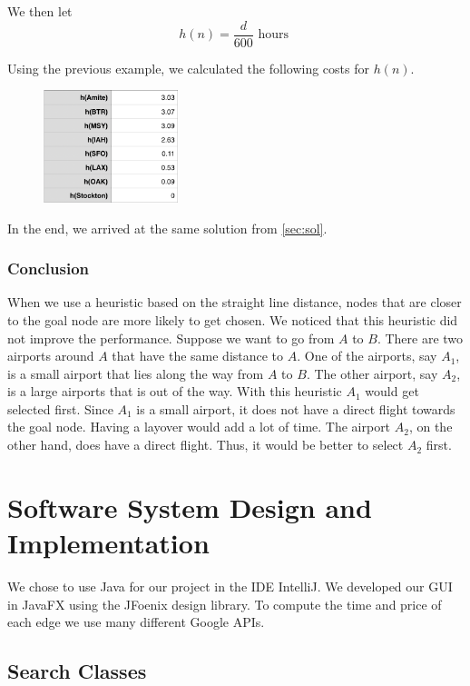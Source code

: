 \documentclass[11pt]{article}
\begin{document}
We then let
$$h(n) = \frac{d}{600} \text{ hours }$$

Using the previous example, we calculated the following costs for $h(n)$.

\begin{figure}[!ht]
  \centering
  \includegraphics[width=0.35\textwidth]{hn}
  \label{fig:time_lim}
\end{figure}

In the end, we arrived at the same solution from \ref{sec:sol}.

\subsubsection{Conclusion}

When we use a heuristic based on the straight line distance, nodes that are closer to the goal node are more likely to get chosen. We noticed that this heuristic did not improve the performance. Suppose we want to go from $A$ to $B$. There are two airports around $A$ that have the same distance to $A$. One of the airports, say $A_1$, is a small airport that lies along the way from $A$ to $B$. The other airport, say $A_2$, is a large airports that is out of the way. With this heuristic $A_1$ would get selected first. Since $A_1$ is a small airport, it does not have a direct flight towards the goal node. Having a layover would add a lot of time. The airport $A_2$, on the other hand, does have a direct flight. Thus, it would be better to select $A_2$ first. 

\section{Software System Design and Implementation}

We chose to use Java for our project in the IDE IntelliJ. We developed our GUI in JavaFX using the JFoenix design library.
To compute the time and price of each edge we use many different Google APIs. 

\subsection{Search Classes}
\end{document}
